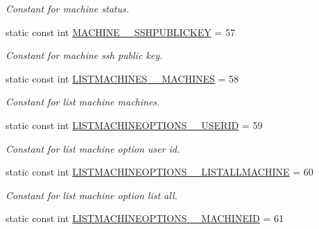 \begin{DoxyCompactItemize}
\begin{DoxyCompactList}\small\item\em Constant for machine status. \item\end{DoxyCompactList}\item 
\hypertarget{classUMS__Data_1_1UMS__DataPackage_a9ca542752dba016af3c3ea52de6b37a8}{
static const int \hyperlink{classUMS__Data_1_1UMS__DataPackage_a9ca542752dba016af3c3ea52de6b37a8}{MACHINE\_\-\_\-SSHPUBLICKEY} = 57}
\label{classUMS__Data_1_1UMS__DataPackage_a9ca542752dba016af3c3ea52de6b37a8}

\begin{DoxyCompactList}\small\item\em Constant for machine ssh public key. \item\end{DoxyCompactList}\item 
\hypertarget{classUMS__Data_1_1UMS__DataPackage_a9ba17a0d9529d69750fbc65d937c72e2}{
static const int \hyperlink{classUMS__Data_1_1UMS__DataPackage_a9ba17a0d9529d69750fbc65d937c72e2}{LISTMACHINES\_\-\_\-MACHINES} = 58}
\label{classUMS__Data_1_1UMS__DataPackage_a9ba17a0d9529d69750fbc65d937c72e2}

\begin{DoxyCompactList}\small\item\em Constant for list machine machines. \item\end{DoxyCompactList}\item 
\hypertarget{classUMS__Data_1_1UMS__DataPackage_a11466af738c5dec6d37c23b91beeb20c}{
static const int \hyperlink{classUMS__Data_1_1UMS__DataPackage_a11466af738c5dec6d37c23b91beeb20c}{LISTMACHINEOPTIONS\_\-\_\-USERID} = 59}
\label{classUMS__Data_1_1UMS__DataPackage_a11466af738c5dec6d37c23b91beeb20c}

\begin{DoxyCompactList}\small\item\em Constant for list machine option user id. \item\end{DoxyCompactList}\item 
\hypertarget{classUMS__Data_1_1UMS__DataPackage_a312bfc42f1a3231e36fd76e051851e57}{
static const int \hyperlink{classUMS__Data_1_1UMS__DataPackage_a312bfc42f1a3231e36fd76e051851e57}{LISTMACHINEOPTIONS\_\-\_\-LISTALLMACHINE} = 60}
\label{classUMS__Data_1_1UMS__DataPackage_a312bfc42f1a3231e36fd76e051851e57}

\begin{DoxyCompactList}\small\item\em Constant for list machine option list all. \item\end{DoxyCompactList}\item 
\hypertarget{classUMS__Data_1_1UMS__DataPackage_ab50bd50f83d664639667349335192913}{
static const int \hyperlink{classUMS__Data_1_1UMS__DataPackage_ab50bd50f83d664639667349335192913}{LISTMACHINEOPTIONS\_\-\_\-MACHINEID} = 61}
\label{classUMS__Data_1_1UMS__DataPackage_ab50bd50f83d664639667349335192913}


\end{DoxyCompactItemize}
